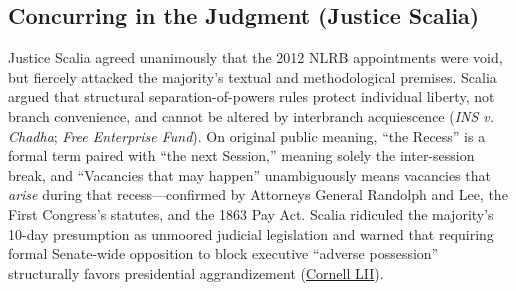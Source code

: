\documentclass[12pt]{article}
\begin{document}
\subsection{Concurring in the Judgment (Justice Scalia)}

Justice Scalia agreed unanimously that the 2012 NLRB appointments were void, but fiercely attacked the majority's textual and methodological premises. Scalia argued that structural separation-of-powers rules protect individual liberty, not branch convenience, and cannot be altered by interbranch acquiescence (\emph{INS v. Chadha}; \emph{Free Enterprise Fund}). On original public meaning, ``the Recess'' is a formal term paired with ``the next Session,'' meaning solely the inter-session break, and ``Vacancies that may happen'' unambiguously means vacancies that \emph{arise} during that recess---confirmed by Attorneys General Randolph and Lee, the First Congress's statutes, and the 1863 Pay Act. Scalia ridiculed the majority's 10-day presumption as unmoored judicial legislation and warned that requiring formal Senate-wide opposition to block executive ``adverse possession'' structurally favors presidential aggrandizement (\href{https://www.law.cornell.edu/supremecourt/text/12-1281}{Cornell LII}).
\end{document}
